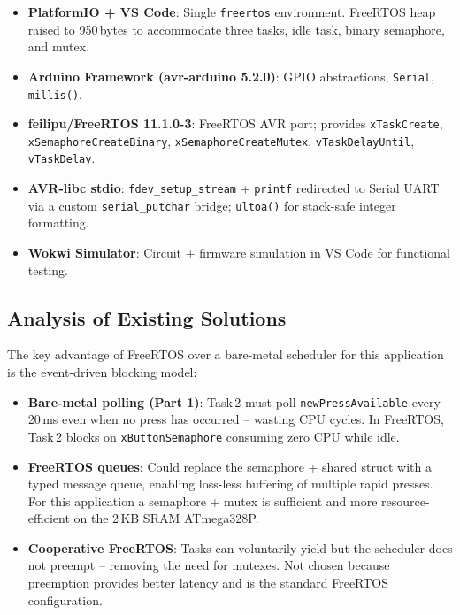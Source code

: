 \documentclass[12pt]{article}
\begin{document}
\begin{itemize}
    \item \textbf{PlatformIO + VS Code}: Single \texttt{freertos} environment. FreeRTOS heap raised to 950\,bytes to accommodate three tasks, idle task, binary semaphore, and mutex.
    \item \textbf{Arduino Framework (avr-arduino 5.2.0)}: GPIO abstractions, \texttt{Serial}, \texttt{millis()}.
    \item \textbf{feilipu/FreeRTOS 11.1.0-3}: FreeRTOS AVR port; provides \texttt{xTaskCreate}, \texttt{xSemaphoreCreateBinary}, \texttt{xSemaphoreCreateMutex}, \texttt{vTaskDelayUntil}, \texttt{vTaskDelay}.
    \item \textbf{AVR-libc stdio}: \texttt{fdev\_setup\_stream} + \texttt{printf} redirected to Serial UART via a custom \texttt{serial\_putchar} bridge; \texttt{ultoa()} for stack-safe integer formatting.
    \item \textbf{Wokwi Simulator}: Circuit + firmware simulation in VS Code for functional testing.
\end{itemize}

\subsection{Analysis of Existing Solutions}
\hspace{0.8cm} The key advantage of FreeRTOS over a bare-metal scheduler for this application is the event-driven blocking model:

\begin{itemize}
    \item \textbf{Bare-metal polling (Part 1)}: Task\,2 must poll \texttt{newPressAvailable} every 20\,ms even when no press has occurred -- wasting CPU cycles. In FreeRTOS, Task\,2 blocks on \texttt{xButtonSemaphore} consuming zero CPU while idle.
    \item \textbf{FreeRTOS queues}: Could replace the semaphore + shared struct with a typed message queue, enabling loss-less buffering of multiple rapid presses. For this application a semaphore + mutex is sufficient and more resource-efficient on the 2\,KB SRAM ATmega328P.
    \item \textbf{Cooperative FreeRTOS}: Tasks can voluntarily yield but the scheduler does not preempt -- removing the need for mutexes. Not chosen because preemption provides better latency and is the standard FreeRTOS configuration.
\end{itemize}
\end{document}
